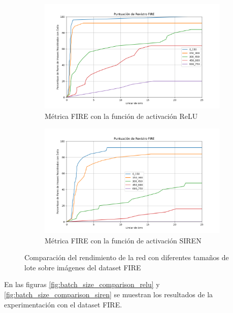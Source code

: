 \begin{figure}[tbp]
    \centering
    \begin{subfigure}[b]{0.5\textwidth}
        \centering
        \includegraphics[width=\textwidth]{imaxes/FIRE_scores/fire_registration_scores_RFMID_MLP.png}
        \caption{Métrica FIRE con la función de activación ReLU}
        \label{fig:FIRERFMID_relu}
    \end{subfigure}\hfill
    \begin{subfigure}[b]{0.5\textwidth}
        \centering
        \includegraphics[width=\textwidth]{imaxes/FIRE_scores/fire_registration_scores_RMIFD_SIREN.png}
        \caption{Métrica FIRE con la función de activación SIREN}
        \label{fig:FIRERFMID_SIREN}
    \end{subfigure}
    \caption{Comparación del rendimiento de la red con diferentes tamaños de lote sobre imágenes del dataset FIRE}
    \label{fig:FIRERFMID_scores}
\end{figure}

En las figuras \ref{fig:batch_size_comparison_relu} y \ref{fig:batch_size_comparison_siren} se muestran los resultados de la experimentación con el dataset FIRE.

